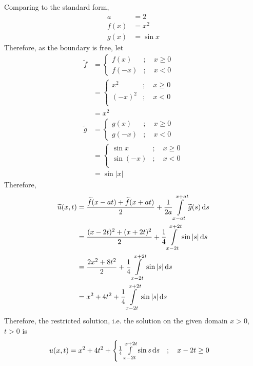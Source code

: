 \documentclass[titlepage, fleqn, a4paper, 12pt, twoside]{article}
\theoremstyle{definition}
\theoremstyle{theorem}
\renewcommand{\tilde}{\widetilde}
\begin{document}
\begin{solution}
	Comparing to the standard form,
	\begin{align*}
		a &= 2\\
		f(x) &= x^2\\
		g(x) &= \sin x
	\end{align*}
	Therefore, as the boundary is free, let
	\begin{align*}
		\tilde{f} &=
			\begin{cases}
				f(x) &;\quad x \ge 0\\
				f(-x) &;\quad x < 0
			\end{cases}\\
		&=
			\begin{cases}
				x^2 &;\quad x \ge 0\\
				(-x)^2 &;\quad x < 0\\
			\end{cases}\\
		&= x^2\\
		\tilde{g} &=
			\begin{cases}
				g(x) &;\quad x \ge 0\\
				g(-x) &;\quad x < 0
			\end{cases}\\
		&=
			\begin{cases}
				\sin x &;\quad x \ge 0\\
				\sin(-x) &;\quad x < 0\\
			\end{cases}\\
		&= \sin|x|
	\end{align*}
	Therefore,
	\begin{align*}
		\tilde{u}(x,t) &= \frac{\tilde{f}(x - a t) + \tilde{f}(x + a t)}{2} + \frac{1}{2 a} \int\limits_{x - a t}^{x + a t} \tilde{g}(s) \dif s\\
		&= \frac{(x - 2 t)^2 + (x + 2 t)^2}{2} + \frac{1}{4} \int\limits_{x - 2 t}^{x + 2 t} \sin|s| \dif s\\
		&= \frac{2 x^2 + 8 t^2}{2} +  \frac{1}{4} \int\limits_{x - 2 t}^{x + 2 t} \sin|s| \dif s\\
		&= x^2 + 4 t^2 + \frac{1}{4} \int\limits_{x - 2 t}^{x + 2 t} \sin|s| \dif s
	\end{align*}
	Therefore, the restricted solution, i.e. the solution on the given domain $x > 0$, $t > 0$ is
	\begin{align*}
		u(x,t) &= x^2 + 4 t^2 + 
			\begin{cases}
				\frac{1}{4} \int\limits_{x - 2 t}^{x + 2 t} \sin s \dif s &;\quad x - 2 t \ge 0\\

\end{cases}
\end{align*}
\end{solution}
\end{document}
